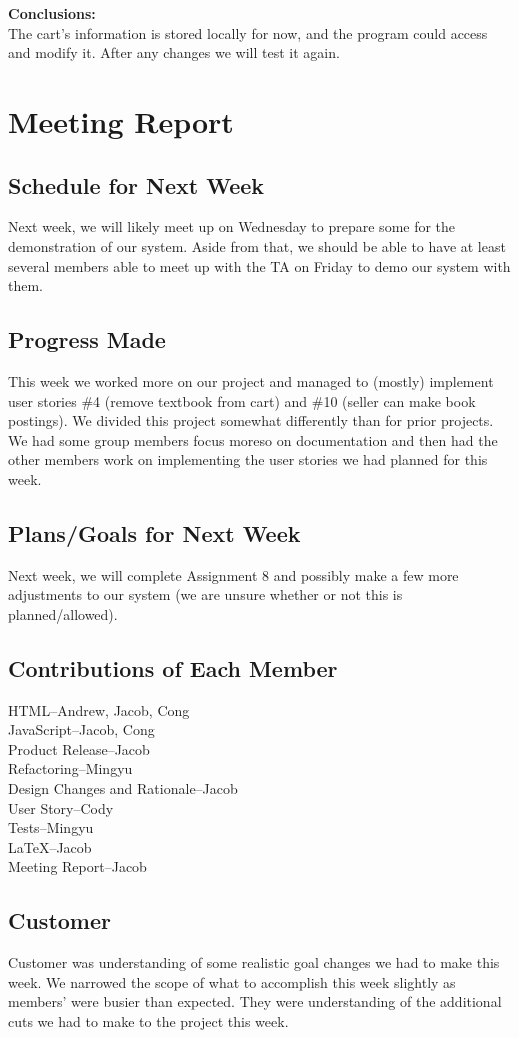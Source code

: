 \documentclass[12pt]{article}
\begin{document}
	\textbf{Conclusions:} \\
	The cart’s information is stored locally for now, and the program could access and modify it. After any changes we will test it again.



	\section{Meeting Report}

		\subsection{Schedule for Next Week}
		Next week, we will likely meet up on Wednesday to prepare some for the demonstration
		of our system. Aside from that, we should be able to have at least several members
		able to meet up with the TA on Friday to demo our system with them.
		

		\subsection{Progress Made}
		This week we worked more on our project and managed to (mostly) implement user
		stories \#4 (remove textbook from cart) and \#10 (seller can make book postings).
		We divided this project somewhat differently than for prior projects. We had some
		group members focus moreso on documentation and then had the other members work on
		implementing the user stories we had planned for this week.

		\subsection{Plans/Goals for Next Week}
		Next week, we will complete Assignment 8 and possibly make a few more adjustments to our system (we are unsure whether or not this is planned/allowed).

		\subsection{Contributions of Each Member}
			HTML--Andrew, Jacob, Cong \\
			JavaScript--Jacob, Cong \\
			Product Release--Jacob \\
			Refactoring--Mingyu           \\
			Design Changes and Rationale--Jacob \\
			User Story--Cody\\
			Tests--Mingyu \\
			LaTeX--Jacob \\
			Meeting Report--Jacob \\


		\subsection{Customer}
		Customer was understanding of some realistic goal changes we had to make this week. We narrowed the scope of what to accomplish this week slightly as members’ were busier than expected. They were understanding of the additional cuts we had to make
		to the project this week.

	
\end{document}

